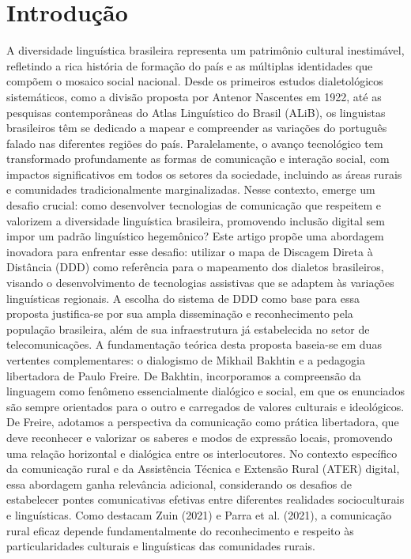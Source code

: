  \chapter{Introdução} %

\begin{flushleft}
A diversidade linguística brasileira representa um patrimônio cultural inestimável, refletindo a rica história de formação do país e as múltiplas identidades que compõem o mosaico social nacional. Desde os primeiros estudos dialetológicos sistemáticos, como a divisão proposta por Antenor Nascentes em 1922, até as pesquisas contemporâneas do Atlas Linguístico do Brasil (ALiB), os linguistas brasileiros têm se dedicado a mapear e compreender as variações do português falado nas diferentes regiões do país.
Paralelamente, o avanço tecnológico tem transformado profundamente as formas de comunicação e interação social, com impactos significativos em todos os setores da sociedade, incluindo as áreas rurais e comunidades tradicionalmente marginalizadas. Nesse contexto, emerge um desafio crucial: como desenvolver tecnologias de comunicação que respeitem e valorizem a diversidade linguística brasileira, promovendo inclusão digital sem impor um padrão linguístico hegemônico?
Este artigo propõe uma abordagem inovadora para enfrentar esse desafio: utilizar o mapa de Discagem Direta à Distância (DDD) como referência para o mapeamento dos dialetos brasileiros, visando o desenvolvimento de tecnologias assistivas que se adaptem às variações linguísticas regionais. A escolha do sistema de DDD como base para essa proposta justifica-se por sua ampla disseminação e reconhecimento pela população brasileira, além de sua infraestrutura já estabelecida no setor de telecomunicações.
A fundamentação teórica desta proposta baseia-se em duas vertentes complementares: o dialogismo de Mikhail Bakhtin e a pedagogia libertadora de Paulo Freire. De Bakhtin, incorporamos a compreensão da linguagem como fenômeno essencialmente dialógico e social, em que os enunciados são sempre orientados para o outro e carregados de valores culturais e ideológicos. De Freire, adotamos a perspectiva da comunicação como
prática libertadora, que deve reconhecer e valorizar os saberes e modos de expressão locais, promovendo uma relação horizontal e dialógica entre os interlocutores.
No contexto específico da comunicação rural e da Assistência Técnica e Extensão Rural (ATER) digital, essa abordagem ganha relevância adicional, considerando os desafios de estabelecer pontes comunicativas efetivas entre diferentes realidades socioculturais e linguísticas. Como destacam Zuin (2021) e Parra et al. (2021), a comunicação rural eficaz depende fundamentalmente do reconhecimento e respeito às particularidades culturais e linguísticas das comunidades rurais.

\end{flushleft}
